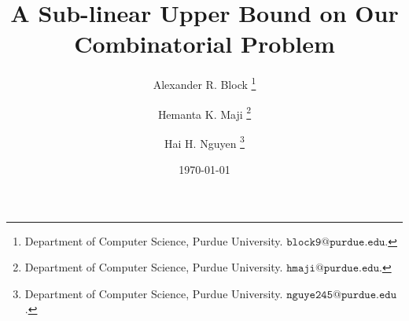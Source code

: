 \documentclass[11pt]{article}
\begin{document}
\def\majiemail{hmaji@purdue.edu}
\def\haiemail{nguye245@purdue.edu}
\def\alexemail{block9@purdue.edu}
\author{
  Alexander R. Block%
  \thanks{
	  Department of Computer Science,
	  Purdue University.
	  \href{mailto:\alexemail}{$\mathtt{\alexemail}$}.
  }\and 
  Hemanta K. Maji%
  \thanks{
    Department of Computer Science,
    Purdue University.
    \href{mailto:\majiemail}{$\mathtt{\majiemail}$}.
  }\and
  Hai H. Nguyen%
  \thanks{
	  Department of Computer Science,
	  Purdue University.
	  \href{mailto:\haiemail}{$\mathtt{\haiemail}$}.
  } 
}


\title{A Sub-linear Upper Bound on Our Combinatorial Problem}

\date{\today}

\maketitle

\pagestyle{empty}
\thispagestyle{empty}

%

\newpage
\newlength{\temp}
\setlength{\temp}{\parskip}
\setlength{\parskip}{.4\parskip}
\tableofcontents
\setlength{\parskip}{\temp}

\newpage
\setcounter{page}{1}
\pagestyle{plain}

\newpage





\newpage


\newpage



\newpage



\newpage
\appendix
\end{document}
